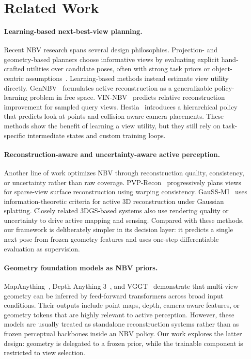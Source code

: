 \section{Related Work}
\label{sec:related}

\paragraph{Learning-based next-best-view planning.}
Recent NBV research spans several design philosophies. Projection- and geometry-based planners choose informative views by evaluating explicit hand-crafted utilities over candidate poses, often with strong task priors or object-centric assumptions~\cite{jia2025pbnbv}. Learning-based methods instead estimate view utility directly. GenNBV~\cite{chen2024gennbv} formulates active reconstruction as a generalizable policy-learning problem in free space. VIN-NBV~\cite{frahm2025vinnbv} predicts relative reconstruction improvement for sampled query views. Hestia~\cite{lu2025hestia} introduces a hierarchical policy that predicts look-at points and collision-aware camera placements. These methods show the benefit of learning a view utility, but they still rely on task-specific intermediate states and custom training loops.

\paragraph{Reconstruction-aware and uncertainty-aware active perception.}
Another line of work optimizes NBV through reconstruction quality, consistency, or uncertainty rather than raw coverage. PVP-Recon~\cite{ye2024pvprecon} progressively plans views for sparse-view surface reconstruction using warping consistency. GauSS-MI~\cite{xie2025gaussmi} uses information-theoretic criteria for active 3D reconstruction under Gaussian splatting. Closely related 3DGS-based systems also use rendering quality or uncertainty to drive active mapping and sensing. Compared with these methods, our framework is deliberately simpler in its decision layer: it predicts a single next pose from frozen geometry features and uses one-step differentiable evaluation as supervision.

\paragraph{Geometry foundation models as NBV priors.}
MapAnything~\cite{keetha2025mapanything}, Depth Anything 3~\cite{lin2025depthanything3}, and VGGT~\cite{wang2025vggt} demonstrate that multi-view geometry can be inferred by feed-forward transformers across broad input conditions. Their outputs include point maps, depth, camera-aware features, or geometry tokens that are highly relevant to active perception. However, these models are usually treated as standalone reconstruction systems rather than as frozen perceptual backbones inside an NBV policy. Our work explores the latter design: geometry is delegated to a frozen prior, while the trainable component is restricted to view selection.

